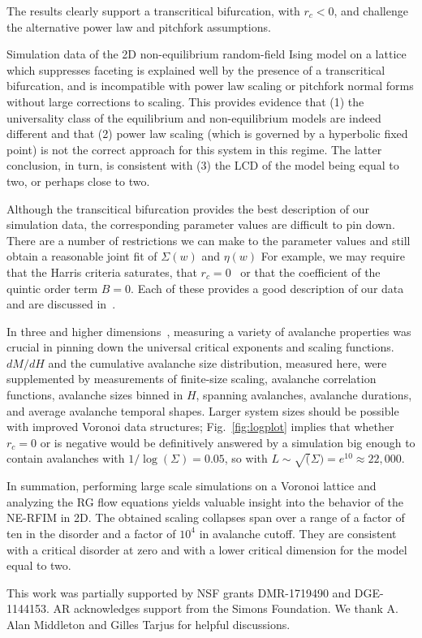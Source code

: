 \documentclass[reprint,amsmath,amssymb,aps,floatfix, prl]{revtex4-1}
\begin{document}
%
\noindent The results clearly support a transcritical bifurcation, with $r_c<0$, and challenge the alternative power law and pitchfork assumptions.\par
%
Simulation data of the 2D non-equilibrium random-field Ising model on a lattice which suppresses faceting is explained well by the presence of a transcritical bifurcation, and is incompatible with power law scaling or pitchfork normal forms without large corrections to scaling. This provides evidence that (1) the universality class of the equilibrium and non-equilibrium models are indeed different and that (2) power law scaling (which is governed by a hyperbolic fixed point) is not the correct approach for this system in this regime. The latter conclusion, in turn, is consistent with (3) the LCD of the model being equal to two, or perhaps close to two.   \par
%
Although the transcitical bifurcation provides the best description of our simulation data, the corresponding parameter values are difficult to pin down. There are a number of restrictions we can make to the parameter values and still obtain a reasonable joint fit of $\Sigma(w)$ and $\eta(w)$ For example, we may require that the Harris criteria saturates, that $r_c=0$~\cite{Perkovic96} or that the coefficient of the quintic order term $B=0$. Each of these provides a good description of our data and are discussed in~\cite[Section~\ref{supp-app:goodfits}]{RFIM2Dsupp}. \par
%
In three and higher dimensions~\cite{Perkovic96,Kuntz00}, measuring a
variety of avalanche properties was crucial in pinning down the
universal critical exponents and scaling functions. $dM/dH$ and the
cumulative avalanche size distribution, measured here, were supplemented by
measurements of finite-size scaling, avalanche correlation functions,
avalanche sizes binned in $H$, spanning avalanches, avalanche durations,
and average avalanche temporal shapes. Larger system sizes should be possible
with improved Voronoi data structures; Fig.~\ref{fig:logplot} implies that
whether $r_c=0$ or is negative would be definitively answered by a simulation
big enough to contain avalanches with $1/\log(\Sigma) = 0.05$, so with
$L \sim \sqrt(\Sigma) = e^{10} \approx 22,000$.\par
%
In summation, performing large scale simulations on a Voronoi lattice and analyzing the RG flow equations yields valuable insight into the behavior of the NE-RFIM in 2D. The obtained scaling collapses span over a range of a factor of ten in the disorder and a factor of $10^4$ in avalanche cutoff. They are consistent with a critical disorder at zero and with a lower critical dimension for the model equal to two. \par
%
This work was partially supported by NSF grants  DMR-1719490 and DGE-1144153. AR acknowledges support from the Simons Foundation. We thank A. Alan Middleton and Gilles Tarjus for helpful discussions. 

{}
\end{document}

